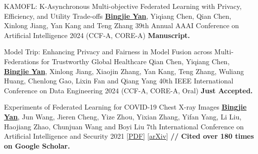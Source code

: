 \begin{cvpublications}
\cvpublication
{KAMOFL: K-Asynchronous Multi-objective Federated Learning with Privacy, Efficiency, and Utility Trade-offs} %
{\underline{\textbf{Bingjie Yan}}, Yiqiang Chen\dag, Qian Chen, Xinlong Jiang, Yan Kang and Teng Zhang} %
{39th Annual AAAI Conference on Artificial Intelligence} %
{2024} %
{(CCF-A, CORE-A\ast)} %
{\textbf{Manuscript.}} %




\cvpublication
{Model Trip: Enhancing Privacy and Fairness in Model Fusion across Multi-Federations for Trustworthy Global Healthcare} %
{Qian Chen, Yiqiang Chen\dag, \underline{\textbf{Bingjie Yan}}, Xinlong Jiang, Xiaojin Zhang, Yan Kang, Teng Zhang, Wuliang Huang, Chenlong Gao, Lixin Fan and Qiang Yang} %
{40th IEEE International Conference on Data Engineering} %
{2024} %
{(CCF-A, CORE-A\ast, \textcolor{awesome}{Oral})} %
{\textbf{Just Accepted.}} %






\cvpublication
{Experiments of Federated Learning for COVID-19 Chest X-ray Images} %
{\underline{\textbf{Bingjie Yan}}, Jun Wang, Jieren Cheng\dag, Yize Zhou, Yixian Zhang, Yifan Yang, Li Liu, Haojiang Zhao, Chunjuan Wang and Boyi Liu} %
{7th International Conference on Artificial Intelligence and Security} %
{2021} %
{} %
{
	\href{https://link.springer.com/chapter/10.1007/978-3-030-78618-2_4}{[PDF]} \href{https://arxiv.org/abs/2007.05592}{[arXiv]}
	\newline \textbf{// Cited over 180 times on Google Scholar.} 
} %



\end{cvpublications}
